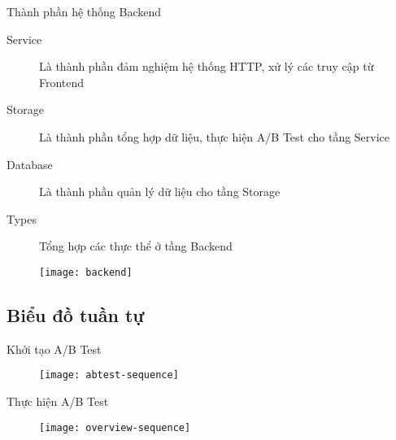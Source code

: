 \begin{frame}{Thành phần hệ thống Backend}
	\begin{description}
		\item[Service] Là thành phần đảm nghiệm hệ thống HTTP, xử lý các truy cập từ Frontend
		\item[Storage] Là thành phần tổng hợp dữ liệu, thực hiện A/B Test cho tầng Service
		\item[Database] Là thành phần quản lý dữ liệu cho tầng Storage
		\item[Types] Tổng hợp các thực thể ở tầng Backend
	\end{description}
	\begin{figure}
		\texttt{[image: backend]}
	\end{figure}
\end{frame}


\subsection{Biểu đồ tuần tự}

\begin{frame}{Khởi tạo A/B Test}
	\begin{figure}
		\texttt{[image: abtest-sequence]}
	\end{figure}
\end{frame}

\begin{frame}{Thực hiện A/B Test}
	\begin{figure}
		\texttt{[image: overview-sequence]}
	\end{figure}
\end{frame}
